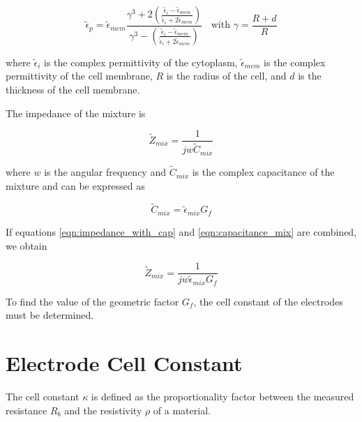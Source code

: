   \begin{equation}
      \tilde{\epsilon}_p = \tilde{\epsilon}_{mem} 
      \frac{\gamma^3+2(\frac{\tilde{\epsilon}_i - \tilde{\epsilon}_{mem}}
      {\tilde{\epsilon}_i + 2\tilde{\epsilon}_{mem}})}{\gamma^3 - (\frac{\tilde{\epsilon}_i - \tilde{\epsilon}_{mem}}{\tilde{\epsilon}_i + 2\tilde{\epsilon}_{mem}})} \;\;\text{  with } 
      \gamma = \frac{R + d}{R} 
  \end{equation}
  
  \noindent where $\tilde{\epsilon}_i$ is the complex permittivity of the cytoplasm, $\tilde{\epsilon}_{mem}$ is the complex permittivity of the cell membrane, $R$ is the radius of the cell, and $d$ is the thickness of the cell membrane.

  
  The impedance of the mixture is
  
  \begin{equation}
    \tilde{Z}_{mix} = \frac{1}{jw\tilde{C}_{mix}}
    \label{eqn:impedance_with_cap}
  \end{equation}
  
  \noindent where $w$ is the angular frequency and $\tilde{C}_{mix}$ is the complex capacitance of the mixture and can be expressed as
  
  \begin{equation}
      \tilde{C}_{mix} = \tilde{\epsilon}_{mix} G_f
      \label{eqn:capacitance_mix}
  \end{equation}
  
  \noindent If equations \ref{eqn:impedance_with_cap} and \ref{eqn:capacitance_mix} are combined, we obtain
  
  \begin{equation}
    \tilde{Z}_{mix} = \frac{1}{jw\tilde{\epsilon}_{mix}G_f}
    \label{eqn:impedance_with_Gf}
  \end{equation}
  
  \par To find the value of the geometric factor $G_f$, the cell constant of the electrodes must be determined.
  
  
  \section{Electrode Cell Constant}
  
  \par The cell constant $\kappa$ is defined as the proportionality factor between the measured resistance $R_b$ and the resistivity $\rho$ of a material.
  
